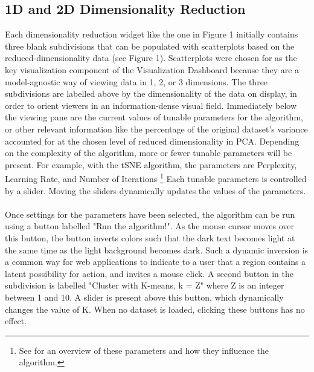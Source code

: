 \documentclass{sigchi}
\begin{document}
\subsection{1D and 2D Dimensionality Reduction}
%
%
Each dimensionality reduction widget like the one in Figure 1 initially contains three blank subdivisions that can be populated with scatterplots based on the reduced-dimensionality data (see Figure 1). %
%
Scatterplots were chosen for as the key visualization component of the Visualization Dashboard because they are a model-agnostic way of viewing data in 1, 2, or 3 dimensions. %
%
The three subdivisions are labelled above by the dimensionality of the data on display, in order to orient viewers in an information-dense visual field. %
%
Immediately below the viewing pane are the current values of tunable parameters for the algorithm, or other relevant information like the percentage of the original dataset's variance accounted for at the chosen level of reduced dimensionality in PCA. %
%
Depending on the complexity of the algorithm, more or fewer tunable parameters will be present. %
%
For example, with the tSNE algorithm, the parameters are Perplexity, Learning Rate, and Number of Iterations%
%
\footnote{See \cite{wattenberg2016how} for an overview of these parameters and how they influence the algorithm.} %
%
Each tunable parameters is controlled by a slider. %
%
Moving the sliders dynamically updates the values of the parameters. %
\\\\
%
Once settings for the parameters have been selected, the algorithm can be run using a button labelled "Run the algorithm!". %
%
As the mouse cursor moves over this button, the button inverts colors such that the dark text becomes light at the same time as the light background becomes dark. %
%
Such a dynamic inversion is a common way for web applications to indicate to a user that a region contains a latent possibility for action, and invites a mouse click. %
%
A second button in the subdivision is labelled "Cluster with K-means, k = Z" where Z is an integer between 1 and 10. %
%
A slider is present above this button, which dynamically changes the value of K. %
%
When no dataset is loaded, clicking these buttons has no effect.
%
%
\end{document}
